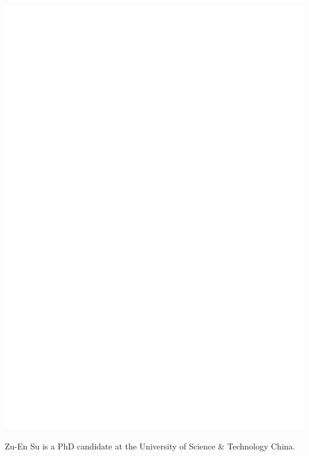\includegraphics[width=\columnwidth]{photo_zuen_su}

Zu-En Su is a PhD candidate at the University of Science \& Technology China.


